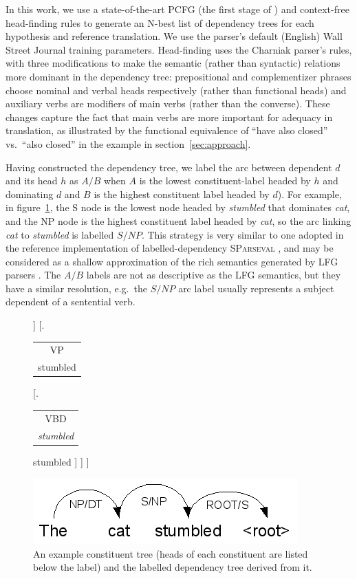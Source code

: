 \documentclass{kluwer}    %
\newcommand{\headlabel}[2]{
  \begin{tabular}{c} #1\\
    {\small #2} \end{tabular}}
\begin{document}
\begin{article}
In this work, we use a state-of-the-art PCFG (the first stage of
) and context-free head-finding
rules \cite{magerman95headfinding} to generate an N-best list of
dependency trees for each hypothesis and reference translation.  We
use the parser's default (English) Wall Street Journal
training parameters.  Head-finding uses the Charniak parser's rules,
with three modifications to make the semantic (rather than syntactic)
relations more dominant in the dependency tree: prepositional and
complementizer phrases choose nominal and verbal heads respectively
(rather than functional heads) and auxiliary verbs are modifiers of
main verbs (rather than the converse). These changes capture the
fact that main verbs are more important for adequacy in translation, as
illustrated by the functional equivalence of ``have also closed'' vs.\ 
``also closed'' in the example in section~\ref{sec:approach}.

Having constructed the dependency tree, we label the arc between dependent
$d$ and its head $h$ as $A/B$ when $A$ is the lowest constituent-label
headed by $h$ and dominating $d$ and $B$ is the highest constituent
label headed by $d$).
%
For example, in figure~\ref{fig:depextract}, the S node is the lowest
node headed by \emph{stumbled} that dominates \emph{cat}, and the NP
node is the highest constituent label headed by \emph{cat}, so the arc
linking \emph{cat} to \emph{stumbled} is labelled $S/NP$.
%
This strategy is very similar to one adopted in the reference
implementation of labelled-dependency \textsc{SParseval} \cite{roark06:sparseval}, and may be
considered as a shallow approximation of the rich semantics generated by LFG
parsers \cite{cahill04lfg}.
%
The $A/B$ labels are not as descriptive as the LFG semantics, but they
have a similar resolution, e.g.\ the $S/NP$ arc label
usually represents a subject dependent of a sentential verb.

\begin{figure}
  \Tree
  [.\headlabel{S}{stumbled}
    [.\headlabel{NP}{cat}
      [.\headlabel{DT}{the} the ]
      [.\headlabel{NN}{cat} cat ]
    ]
    [.\headlabel{VP}{stumbled} 
      [.\headlabel{VBD}{\it stumbled} stumbled ]
    ]
  ]
  \\
  \begin{center}
    \includegraphics[scale=0.6]{dpm-example-depextract}
  \end{center}
  \caption{An example constituent tree (heads of each constituent are
    listed below the label) and the labelled dependency tree
    derived from it.}
  \label{fig:depextract}
\end{figure}


\end{article}
\end{document}
